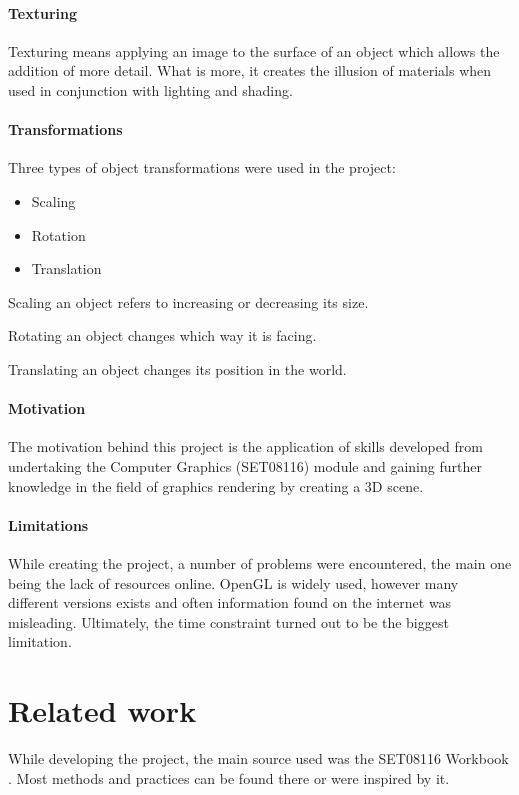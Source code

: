 \documentclass[10pt, a4paper]{article}
\begin{document}
    \paragraph{Texturing}
    Texturing means applying an image to the surface of an object which allows the addition of more detail. What is more, it creates the illusion of materials when used in conjunction with lighting and shading.

    \paragraph{Transformations}
    Three types of object transformations were used in the project:
    \begin{itemize}
        \item Scaling
        \item Rotation
        \item Translation
    \end{itemize}
    Scaling an object refers to increasing or decreasing its size.

    Rotating an object changes which way it is facing.

    Translating an object changes its position in the world.


    \paragraph{Motivation}
    The motivation behind this project is the application of skills developed from undertaking the Computer Graphics (SET08116) module and gaining further knowledge in the field of graphics rendering by creating a 3D scene.

    \paragraph{Limitations}
    While creating the project, a number of problems were encountered, the main one being the lack of resources online. OpenGL is widely used, however many different versions exists and often information found on the internet was misleading. Ultimately, the time constraint turned out to be the biggest limitation.

    \section{Related work}
    While developing the project, the main source used was the SET08116 Workbook \cite{workbook}. Most methods and practices can be found there or were inspired by it.
\end{document}
